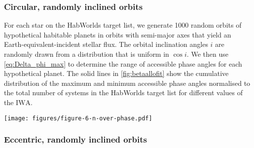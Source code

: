 \documentclass[
    usenatbib,
]{mnras}
\newcommand{\IWA}{\ensuremath{\mathrm{IWA}}}
\newcommand{\hwo}{HabWorlds}
\begin{document}
\subsubsection{Circular, randomly inclined orbits}
\label{sec:circular}

For each star on the \hwo{} target list, we generate \num{1000} random orbits of hypothetical habitable planets in orbits with semi-major axes that yield an Earth-equivalent-incident stellar flux. 
%
The orbital inclination angles $i$ are randomly drawn from a distribution 
that is uniform in $\cos i$. 
%
We then use \cref{eq:Delta_phi_max} to determine the range of 
accessible phase angles for each hypothetical planet.
%
The solid lines in \cref{fig:betaallofit} show the cumulative 
distribution of the maximum and minimum accessible phase 
angles normalised to the total number of systems in the \hwo{} 
target list for different values of the \IWA{}.


\begin{figure*}%
    \centering
    \texttt{[image: figures/figure-6-n-over-phase.pdf]}
    \caption{
        The cumulative distributions of the most extreme phase angles accessible for different \IWA{} and for randomly inclined, circular orbits
        (solid lines) and randomly inclined, elliptical orbits (dashed lines).
        The top $x$-axis indicates the minimum and the 
        bottom $x$-axis the maximum accessible phase angle.
        These angles are symmetric about quadrature (90 degrees).
        The $y$-axis on the left indicates the number of planetary systems 
        divided by the number of Monte Carlo samples and is thus normalised to 
        the number of systems on the target list.
        The $y$-axis on the right indicates the number of systems, assuming \qty{24}{\percent} of them have an Earth-like planet in their HZ.
    }
    \label{fig:betaallofit}
\end{figure*}

\subsubsection{Eccentric, randomly inclined orbits}
\label{sec:eccentric}
\end{document}
